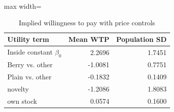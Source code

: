 \begin{table}[htbp]\centering\small
\caption{Implied willingness to pay with price controls}
\label{tab:wtp-demand_controlled}
\begin{adjustbox}{max width=\linewidth}
\begin{tabular}{lrr}\toprule
Utility term & Mean WTP & Population SD\\\midrule
Inside constant $\beta_0$ & 2.2696 & 1.7451 \\
Berry vs. other & -1.0081 & 0.7751 \\
Plain vs. other & -0.1832 & 0.1409 \\
novelty & -1.2086 & 1.8083 \\
own stock & 0.0574 & 0.1600 \\
\bottomrule\end{tabular}
\end{adjustbox}
\end{table}
